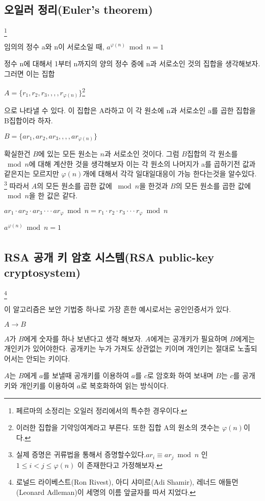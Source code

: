 \documentclass{oblivoir}
\begin{document}
\section{오일러 정리(Euler's theorem)} \footnote{페르마의 소정리는 오일러 정리에서의 특수한 경우이다.}
\begin{justbox}
임의의 정수 a와 n이 서로소일 때, $a^{\varphi(n)} \bmod n = 1$
\end{justbox}
정수 n에 대해서 1부터 n까지의 양의 정수 중에 n과 서로소인 것의 집합을 생각해보자.
그러면 이는 집합
\begin{center}
    $A = \{ r_1 ,r_2,r_3,,,,r_{\varphi(n)}\}$\footnote{이러한 집합을 기약잉여계라고 부른다. 또한 집합 A의 원소의 갯수는 $\varphi(n)$이다.}
\end{center}
으로 나타낼 수 있다. 이 집합은 A라하고 이 각 원소에 n과 서로소인 a를 곱한 집합을 B집합이라 하자.
\begin{center}
    $B = \{ ar_1 ,ar_2,ar_3,,,,ar_{\varphi(n)}\} $
\end{center}
확실한건 $B$에 있는 모든 원소는 $n$과 서로소인 것이다. 그럼 $B$집합의 각 원소를 $\bmod n$에 대해 계산한 것을 생각해보자 이는 각 원소의 나머지가 a를 곱하기전 값과 같은지는 모르지만 $\varphi(n)$개에 대해서 각각 일대일대응이 가능 한다는것을 알수있다. \footnote{실제 증명은 귀류법을 통해서 증명할수있다.$ar_i  \equiv ar_j \bmod n $ 인 $1 \le i < j \le \varphi(n)$ 이 존재한다고 가정해보자.}
따라서 $A$의 모든 원소를 곱한 값에 $\bmod n$을 한것과 $B$의 모든 원소를 곱한 값에 $\bmod n$을 한 값은 같다.
\begin{center}
    $ar_1 \cdot ar_2 \cdot ar_3 \cdot\cdot\cdot ar_{\varphi}\bmod n = r_1 \cdot r_2 \cdot r_3 \cdot\cdot\cdot r_{\varphi} \bmod n$
\end{center}
\begin{center}
    $a^{\varphi(n)}\bmod n= 1$
\end{center}

\newpage
\chapter{}
\section{RSA 공개 키 암호 시스템(RSA public-key cryptosystem)}
\footnote{로널드 라이베스트(Ron Rivest), 아디 샤미르(Adi Shamir), 레너드 애들먼(Leonard Adleman)이 세명의 이름 앞글자를 따서 지었다.}

이 알고리즘은 보안 기법중 하나로 가장 흔한 예시로서는 공인인증서가 있다.
\begin{center}
    $A \longrightarrow B$
\end{center}
$A$가 $B$에게 숫자를 하나 보낸다고 생각 해보자. $A$에게는 공개키가 필요하며 $B$에게는 개인키가 있어야한다. 공개키는 누가 가져도 상관없는 키이며 개인키는 절대로 노출되어서는 안되는 키이다.\par
$A$는 $B$에게 $a$를 보낼때 공개키를 이용하여 $a$를 $c$로 암호화 하여 보내며 $B$는 $c$를 공개키와 개인키를 이용하여 $a$로 복호화하여 읽는 방식이다.
\end{document}
